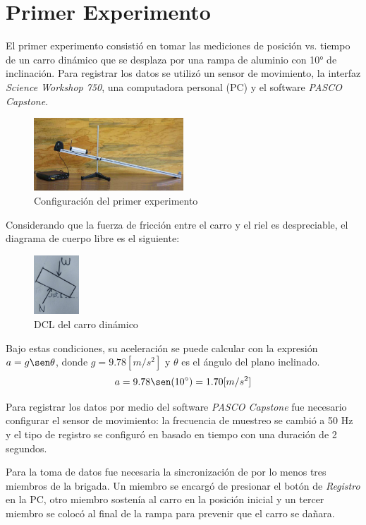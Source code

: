 \documentclass[12pt, titlepage]{report}
\begin{document}
    \section*{Primer Experimento}
    El primer experimento consistió en tomar las mediciones de posición vs. tiempo de un carro dinámico que se desplaza por una rampa de aluminio con 10° de inclinación. Para registrar los datos se utilizó un sensor de movimiento, la interfaz \textit{Science Workshop 750}, una computadora personal (PC) y el software \textit{PASCO Capstone}.

    \begin{figure}[ht]
        \centering
        \setcounter{figure}{0}
        \includegraphics[width=0.5\textwidth]{Rampa_Exp1.png}
        \caption{Configuración del primer experimento}
    \end{figure}

    Considerando que la fuerza de fricción entre el carro y el riel es despreciable, el diagrama de cuerpo libre es el siguiente: 

    \begin{figure}[ht]
        \centering
        \includegraphics[width=0.15\textwidth]{DCL_E1.jpg}
        \caption{DCL del carro dinámico}
    \end{figure}

    Bajo estas condiciones, su aceleración se puede calcular con la expresión $a=g\sen\theta$, donde $g=9.78[m/s^2]$ y $\theta$ es el ángulo del plano inclinado.
    $$a=9.78\sen(10^\circ) = 1.70[m/s^2]$$

    Para registrar los datos por medio del software \textit{PASCO Capstone} fue necesario configurar el sensor de movimiento: la frecuencia de muestreo se cambió a 50 Hz y el tipo de registro se configuró en basado en tiempo con una duración de 2 segundos. 

    Para la toma de datos fue necesaria la sincronización de por lo menos tres miembros de la brigada. Un miembro se encargó de presionar el botón de \textit{Registro} en la PC, otro miembro sostenía al carro en la posición inicial y un tercer miembro se colocó al final de la rampa para prevenir que el carro se dañara.
\end{document}
